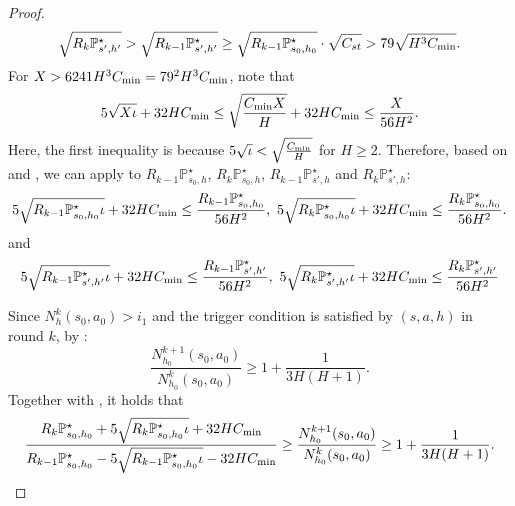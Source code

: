 \documentclass{article}
\begin{document}
\begin{proof}
\begin{align}
\label{k-1s'}
    \sqrt{R_{k}\mathbb{P}_{s',h'}^{\star}}>\sqrt{R_{k-1}\mathbb{P}_{s',h'}^{\star}} \geq \sqrt{R_{k-1}\mathbb{P}_{s_0,h_0}^{\star}} \cdot \sqrt{C_{st}} > 79\sqrt{H^3C_{\textnormal{min}}}.
\end{align}
For $X > 6241H^3C_{\textnormal{min}}= 79^2H^3C_{\textnormal{min}}$, note that
\begin{equation}
\label{lemmalargeN}
    5\sqrt{X\iota} + 32HC_{\textnormal{min}} \leq  \sqrt{\frac{C_{\textnormal{min}}X}{H}} + 32HC_{\textnormal{min}} \leq \frac{X}{56H^2} .
\end{equation}
Here, the first inequality is because $5\sqrt{\iota} < \sqrt{\frac{C_{\textnormal{min}}}{H}}$ for $H \geq 2$. Therefore, based on  and , we can apply  to $R_{k-1}\mathbb{P}_{s_0,h}^{\star}$, $R_{k}\mathbb{P}_{s_0,h}^{\star}$, $R_{k-1}\mathbb{P}_{s',h}^{\star}$ and $R_{k}\mathbb{P}_{s',h}^{\star}$:
\begin{align}
\label{k-1in}
    5\sqrt{R_{k-1}\mathbb{P}_{s_0,h_0}^{\star}\iota} + 32HC_{\textnormal{min}} \leq \frac{R_{k-1}\mathbb{P}_{s_0,h_0}^{\star}}{56H^2},\ 5\sqrt{R_{k}\mathbb{P}_{s_0,h_0}^{\star}\iota} + 32HC_{\textnormal{min}} \leq \frac{R_{k}\mathbb{P}_{s_0,h_0}^{\star}}{56H^2}.
\end{align}
and
\begin{align}
\label{k-1in'}
    5\sqrt{R_{k-1}\mathbb{P}_{s',h'}^{\star}\iota} + 32HC_{\textnormal{min}} \leq \frac{R_{k-1}\mathbb{P}_{s',h'}^{\star}}{56H^2},\  5\sqrt{R_{k}\mathbb{P}_{s',h'}^{\star}\iota} + 32HC_{\textnormal{min}} \leq \frac{R_{k}\mathbb{P}_{s',h'}^{\star}}{56H^2}
\end{align}

Since $N_h^k(s_0,a_0) > i_1$ and the trigger condition is satisfied by $(s,a,h)$ in round $k$, by :
$$\frac{N_{h_0}^{k+1}(s_0,a_0)}{N_{h_0}^{k}(s_0,a_0)} \geq 1+\frac{1}{3H(H+1)}.$$
Together with , it holds that
\begin{equation}
\label{s0lower}
\frac{R_{k}\mathbb{P}_{s_0,h_0}^{\star} + 5\sqrt{R_{k}\mathbb{P}_{s_0,h_0}^{\star}\iota} + 32HC_{\textnormal{min}}}{R_{k-1}\mathbb{P}_{s_0,h_0}^{\star} - 5\sqrt{R_{k-1}\mathbb{P}_{s_0,h_0}^{\star}\iota} - 32HC_{\textnormal{min}}} \geq \frac{N_{h_0}^{k+1}(s_0,a_0)}{N_{h_0}^{k}(s_0,a_0)} \geq 1+\frac{1}{3H(H+1)}.
\end{equation}


\end{proof}
\end{document}
